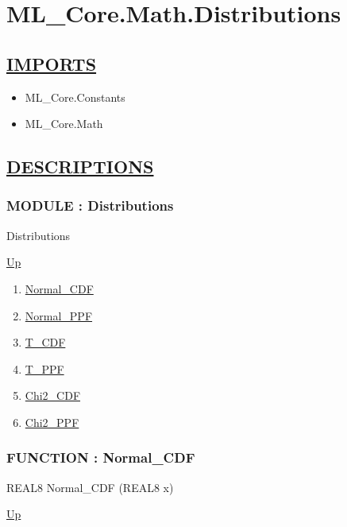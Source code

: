 \chapter*{ML\_Core.Math.Distributions}
\hypertarget{ecldoc:toc:ML_Core.Math.Distributions}{}

\section*{\underline{IMPORTS}}
\begin{itemize}
\item ML\_Core.Constants
\item ML\_Core.Math
\end{itemize}

\section*{\underline{DESCRIPTIONS}}
\subsection*{MODULE : Distributions}
\hypertarget{ecldoc:ML_Core.Math.Distributions}{}
\begin{minipage}[t]{\textwidth}
\begin{flushleft}
 Distributions 
\end{flushleft}
\end{minipage}
\hyperlink{ecldoc:toc:ML_Core/Math}{Up}

\par
\par
\begin{enumerate}
\item \hyperlink{ecldoc:ml_core.math.distributions.normal_cdf}{Normal\_CDF}
\item \hyperlink{ecldoc:ml_core.math.distributions.normal_ppf}{Normal\_PPF}
\item \hyperlink{ecldoc:ml_core.math.distributions.t_cdf}{T\_CDF}
\item \hyperlink{ecldoc:ml_core.math.distributions.t_ppf}{T\_PPF}
\item \hyperlink{ecldoc:ml_core.math.distributions.chi2_cdf}{Chi2\_CDF}
\item \hyperlink{ecldoc:ml_core.math.distributions.chi2_ppf}{Chi2\_PPF}
\end{enumerate}
\subsection*{FUNCTION : Normal\_CDF}
\hypertarget{ecldoc:ml_core.math.distributions.normal_cdf}{}
\begin{minipage}[t]{\textwidth}
\begin{flushleft}
REAL8 Normal\_CDF (REAL8 x)
\end{flushleft}
\end{minipage}
\hyperlink{ecldoc:ML_Core.Math.Distributions}{Up}


